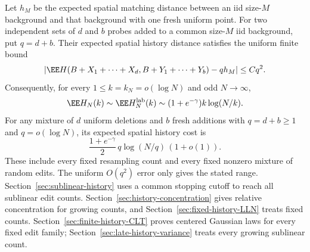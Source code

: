 \documentclass[11pt,letterpaper]{article}
\begin{document}
\begin{theorem}
\label{thm:sharp-small-edits}
Let $h_M$ be the expected spatial matching distance between an iid
size-$M$ background and that background with one fresh uniform point.
For two independent sets of $d$ and $b$ probes added to a common
size-$M$ iid background, put $q=d+b$. Their expected spatial history
distance satisfies the uniform finite bound
\begin{equation}\label{eq:history-linearization}
 \left|\EE H(B+X_1+\cdots+X_d,
                   B+Y_1+\cdots+Y_b)-q h_M\right|\le Cq^2.
\end{equation}
Consequently, for every $1\le k=k_N=o(\log N)$ and odd $N\to\infty$,
\begin{equation}\label{eq:sharp-small-resampling}
 \EE H_N(k)\sim\EE H_N^{\rm lab}(k)
       \sim(1+e^{-\gamma})k\log(N/k).
\end{equation}
For any mixture of $d$ uniform deletions and $b$ fresh additions with
$q=d+b\ge1$ and $q=o(\log N)$, its expected spatial history cost is
\begin{equation}\label{eq:sharp-small-mixed}
 \frac{1+e^{-\gamma}}2\,q\log(N/q)\,(1+o(1)).
\end{equation}
These include every fixed resampling count and every fixed nonzero
mixture of random edits. The uniform $O(q^2)$ error only gives the stated range.
Section~\ref{sec:sublinear-history} uses a common stopping cutoff
to reach all sublinear edit counts.
Section~\ref{sec:history-concentration} gives relative concentration
for growing counts, and Section~\ref{sec:fixed-history-LLN} treats
fixed counts. Section~\ref{sec:finite-history-CLT} proves centered Gaussian laws for every fixed edit family;
Section~\ref{sec:late-history-variance} treats every growing sublinear count.
\end{theorem}
\end{document}
